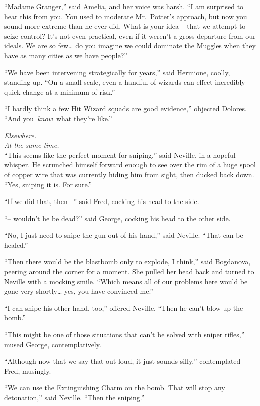 ``Madame Granger,'' said Amelia, and her voice was harsh. ``I am
surprised to hear this from you. You used to moderate Mr.~Potter's
approach, but now you sound more extreme than he ever did. What is your
idea -- that we attempt to seize control? It's not even practical, even
if it weren't a gross departure from our ideals. We are so few\ldots{}
do you imagine we could dominate the Muggles when they have as many
cities as we have people?''

``We have been intervening strategically for years,'' said Hermione,
coolly, standing up. ``On a small scale, even a handful of wizards can
effect incredibly quick change at a minimum of risk.''

``I hardly think a few Hit Wizard squads are good evidence,'' objected
Dolores. ``And you~\emph{know}~what they're like.''

\mybreak

\emph{Elsewhere.}\\
\emph{At the same time.}\\

``This seems like the perfect moment for sniping,'' said Neville, in a
hopeful whisper. He scrunched himself forward enough to see over the rim
of a huge spool of copper wire that was currently hiding him from sight,
then ducked back down. ``Yes, sniping it is. For sure.''

``If we did that, then --'' said Fred, cocking his head to the side.

``-- wouldn't he be dead?'' said George, cocking his head to the other
side.

``No, I just need to snipe the gun out of his hand,'' said Neville.
``That can be healed.''

``Then there would be the blastbomb only to explode, I think,'' said
Bogdanova, peering around the corner for a moment. She pulled her head
back and turned to Neville with a mocking smile. ``Which means all of
our problems here would be gone very shortly\ldots{} yes, you have
convinced me.''

``I can snipe his other hand, too,'' offered Neville. ``Then he can't
blow up the bomb.''

``This might be one of those situations that can't be solved with sniper
rifles,'' mused George, contemplatively.

``Although now that we say that out loud, it just sounds silly,''
contemplated Fred, musingly.

``We can use the Extinguishing Charm on the bomb. That will stop any
detonation,'' said Neville. ``Then the sniping.''

